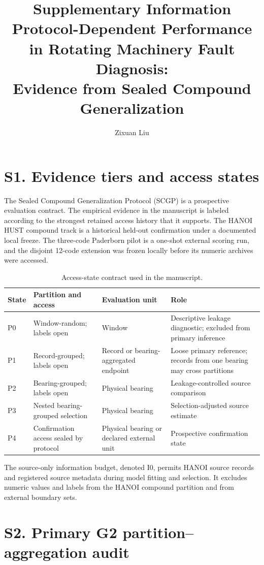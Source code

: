 \documentclass[11pt]{article}
\title{Supplementary Information\\
\large Protocol-Dependent Performance in Rotating Machinery Fault Diagnosis:\\Evidence from Sealed Compound Generalization}
\author{Zixuan Liu}
\date{}
\begin{document}
\maketitle

\section*{S1. Evidence tiers and access states}

The Sealed Compound Generalization Protocol (SCGP) is a prospective evaluation contract. The empirical evidence in the manuscript is labeled according to the strongest retained access history that it supports. The HANOI HUST compound track is a historical held-out confirmation under a documented local freeze. The three-code Paderborn pilot is a one-shot external scoring run, and the disjoint 12-code extension was frozen locally before its numeric archives were accessed.

\begin{table}[h]
\centering
\small
\caption{Access-state contract used in the manuscript.}
\begin{tabular}{p{}p{}p{}p{}}
\toprule
State & Partition and access & Evaluation unit & Role \\
\midrule
P0 & Window-random; labels open & Window & Descriptive leakage diagnostic; excluded from primary inference \\
P1 & Record-grouped; labels open & Record or bearing-aggregated endpoint & Loose primary reference; records from one bearing may cross partitions \\
P2 & Bearing-grouped; labels open & Physical bearing & Leakage-controlled source comparison \\
P3 & Nested bearing-grouped selection & Physical bearing & Selection-adjusted source estimate \\
P4 & Confirmation access sealed by protocol & Physical bearing or declared external unit & Prospective confirmation state \\
\bottomrule
\end{tabular}
\end{table}

The source-only information budget, denoted I0, permits HANOI source records and registered source metadata during model fitting and selection. It excludes numeric values and labels from the HANOI compound partition and from external boundary sets.

\section*{S2. Primary G2 partition--aggregation audit}
\end{document}
